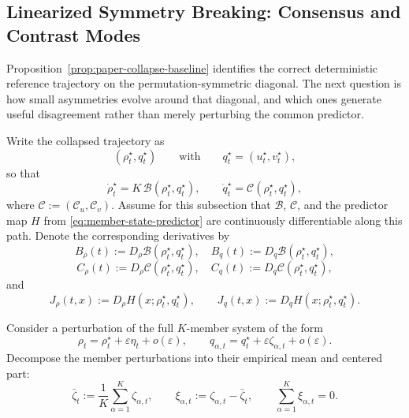 \subsection{Linearized Symmetry Breaking: Consensus and Contrast Modes}

Proposition~\ref{prop:paper-collapse-baseline} identifies the correct deterministic reference trajectory on the permutation-symmetric diagonal. The next question is how small asymmetries evolve around that diagonal, and which ones generate useful disagreement rather than merely perturbing the common predictor.

Write the collapsed trajectory as
\[
(\rho_t^\star,q_t^\star)
\qquad
\text{with}
\qquad
q_t^\star=(u_t^\star,v_t^\star),
\]
so that
\[
\dot\rho_t^\star = K\,\mathcal B(\rho_t^\star,q_t^\star),
\qquad
\dot q_t^\star = \mathcal C(\rho_t^\star,q_t^\star),
\]
where $\mathcal C:=(\mathcal C_u,\mathcal C_v)$. Assume for this subsection that $\mathcal B$, $\mathcal C$, and the predictor map $H$ from \eqref{eq:member-state-predictor} are continuously differentiable along this path. Denote the corresponding derivatives by
\[
B_\rho(t):=D_\rho\mathcal B(\rho_t^\star,q_t^\star),
\quad
B_q(t):=D_q\mathcal B(\rho_t^\star,q_t^\star),
\]
\[
C_\rho(t):=D_\rho\mathcal C(\rho_t^\star,q_t^\star),
\quad
C_q(t):=D_q\mathcal C(\rho_t^\star,q_t^\star),
\]
and
\[
J_\rho(t,x):=D_\rho H(x;\rho_t^\star,q_t^\star),
\qquad
J_q(t,x):=D_q H(x;\rho_t^\star,q_t^\star).
\]

Consider a perturbation of the full $K$-member system of the form
\[
\rho_t = \rho_t^\star + \varepsilon \eta_t + o(\varepsilon),
\qquad
q_{\alpha,t} = q_t^\star + \varepsilon \zeta_{\alpha,t} + o(\varepsilon).
\]
Decompose the member perturbations into their empirical mean and centered part:
\[
\bar\zeta_t:=\frac{1}{K}\sum_{\alpha=1}^K \zeta_{\alpha,t},
\qquad
\xi_{\alpha,t}:=\zeta_{\alpha,t}-\bar\zeta_t,
\qquad
\sum_{\alpha=1}^K \xi_{\alpha,t}=0.
\]


